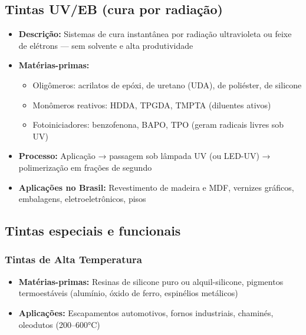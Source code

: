\documentclass[
  12pt,
  a4paper,
  oneside,
  brazil,
  chapter=TITLE
]{article}
\begin{document}
\subsection{Tintas UV/EB (cura por
radiação)}\label{tintas-uveb-cura-por-radiauxe7uxe3o}

\begin{itemize}
\tightlist
\item
  \textbf{Descrição:} Sistemas de cura instantânea por radiação
  ultravioleta ou feixe de elétrons --- sem solvente e alta
  produtividade
\item
  \textbf{Matérias-primas:}

  \begin{itemize}
  \tightlist
  \item
    Oligômeros: acrilatos de epóxi, de uretano (UDA), de poliéster, de
    silicone
  \item
    Monômeros reativos: HDDA, TPGDA, TMPTA (diluentes ativos)
  \item
    Fotoiniciadores: benzofenona, BAPO, TPO (geram radicais livres sob
    UV)
  \end{itemize}
\item
  \textbf{Processo:} Aplicação → passagem sob lâmpada UV (ou LED-UV) →
  polimerização em frações de segundo
\item
  \textbf{Aplicações no Brasil:} Revestimento de madeira e MDF, vernizes
  gráficos, embalagens, eletroeletrônicos, pisos
\end{itemize}

\subsection{Tintas especiais e
funcionais}\label{tintas-especiais-e-funcionais}

\subsubsection{Tintas de Alta
Temperatura}\label{tintas-de-alta-temperatura}

\begin{itemize}
\tightlist
\item
  \textbf{Matérias-primas:} Resinas de silicone puro ou alquil-silicone,
  pigmentos termoestáveis (alumínio, óxido de ferro, espinélios
  metálicos)
\item
  \textbf{Aplicações:} Escapamentos automotivos, fornos industriais,
  chaminés, oleodutos (200--600°C)
\end{itemize}
\end{document}
